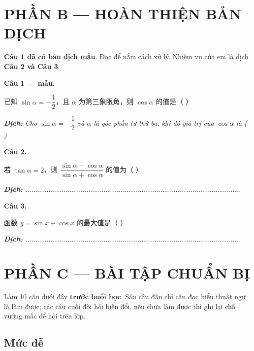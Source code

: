 \documentclass[11pt, a4paper]{article}
\begin{document}
\section{PHẦN B — HOÀN THIỆN BẢN DỊCH}

\textbf{Câu 1 đã có bản dịch mẫu}. Đọc để nắm cách xử lý. Nhiệm vụ của em là dịch \textbf{Câu 2 và Câu 3}.

\textbf{Câu 1 — mẫu.}

已知 $\sin\alpha = -\dfrac{1}{2}$，且 $\alpha$ 为第三象限角，则 $\cos\alpha$ 的值是（ ）

\noindent\emph{\textbf{Dịch:} Cho $\sin\alpha = -\dfrac{1}{2}$ và $\alpha$ là góc phần tư thứ ba, khi đó giá trị của $\cos\alpha$ là ( )}

\textbf{Câu 2.}

若 $\tan\alpha = 2$，则 $\dfrac{\sin\alpha - \cos\alpha}{\sin\alpha + \cos\alpha}$ 的值为（ ）

\noindent\emph{\textbf{Dịch:} ......................................................................................................}

\textbf{Câu 3.}

函数 $y = \sin x + \cos x$ 的最大值是（ ）

\noindent\emph{\textbf{Dịch:} ......................................................................................................}

\section{PHẦN C — BÀI TẬP CHUẨN BỊ}

Làm 10 câu dưới đây \textbf{trước buổi học}. Sáu câu đầu chỉ cần đọc hiểu thuật ngữ là làm được; các câu cuối đòi hỏi biến đổi, nếu chưa làm được thì ghi lại chỗ vướng mắc để hỏi trên lớp.

\subsection{Mức dễ}
\end{document}
